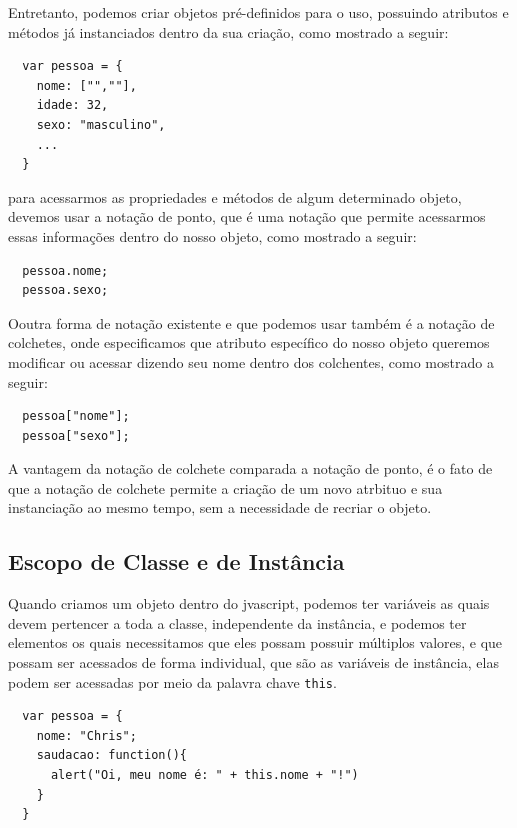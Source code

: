 \documentclass[12pt, a4paper]{paper}
\begin{document}
Entretanto, podemos criar objetos pré-definidos para o uso, possuindo atributos e 
métodos já instanciados dentro da sua criação, como mostrado a seguir: 

\begin{verbatim}
  var pessoa = {
    nome: ["",""],
    idade: 32,
    sexo: "masculino",
    ...
  }
\end{verbatim}

para acessarmos as propriedades e métodos de algum determinado objeto, devemos usar 
a notação de ponto, que é uma notação que permite acessarmos essas informações dentro 
do nosso objeto, como mostrado a seguir:

\begin{verbatim}
  pessoa.nome;
  pessoa.sexo;
\end{verbatim}

Ooutra forma de notação existente e que podemos usar também é a notação de colchetes,
onde especificamos que atributo específico do nosso objeto queremos modificar ou 
acessar dizendo seu nome dentro dos colchentes, como mostrado a seguir:

\begin{verbatim}
  pessoa["nome"];
  pessoa["sexo"];
\end{verbatim}

A vantagem da notação de colchete comparada a notação de ponto, é o fato de que a 
notação de colchete permite a criação de um novo atrbituo e sua instanciação ao mesmo 
tempo, sem a necessidade de recriar o objeto.

\subsection{Escopo de Classe e de Instância} %
\label{sub:Escopo de Classe e de Instância}
Quando criamos um objeto dentro do jvascript, podemos ter variáveis as quais devem 
pertencer a toda a classe, independente da instância, e podemos ter elementos os 
quais necessitamos que eles possam possuir múltiplos valores, e que possam ser 
acessados de forma individual, que são as variáveis de instância, elas podem ser 
acessadas por meio da palavra chave \texttt{this}. 

\begin{verbatim}
  var pessoa = {
    nome: "Chris";
    saudacao: function(){
      alert("Oi, meu nome é: " + this.nome + "!")
    }
  }
\end{verbatim}
\end{document}
